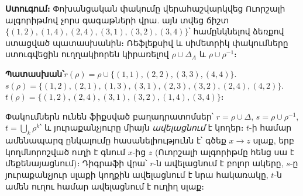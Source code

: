 \documentclass[11pt,a4paper]{article}
\newcommand{\answer}[1]{\begin{answerbox}\centering\textbf{Պատասխան՝}\quad #1\end{answerbox}}
\begin{document}
\begin{center}
\end{center}

\textbf{Ստուգում։} Փոխանցական փակումը վերահաշվարկվեց Ուորշալի ալգորիթմով չորս գագաթների վրա. այն
տվեց ճիշտ $\{(1,2),(1,4),(2,4),(3,1),(3,2),(3,4)\}$՝ համընկնելով ձեռքով ստացված պատասխանին։
Ռեֆլեքսիվ և սիմետրիկ փակումները ստուգվեցին ուղղակիորեն կիրառելով $\rho\cup\Delta_A$ և $\rho\cup\rho^{-1}$։
\checkmark

\answer{$r(\rho)=\rho\cup\{(1,1),(2,2),(3,3),(4,4)\}$.\quad
$s(\rho)=\{(1,2),(2,1),(1,3),(3,1),(2,3),(3,2),(2,4),(4,2)\}$.\quad
$t(\rho)=\{(1,2),(2,4),(3,1),(3,2),(1,4),(3,4)\}$։}

\begin{methodbox}
Փակումներն ունեն ֆիքսված բաղադրատոմսեր՝ $r=\rho\cup\Delta$,
$s=\rho\cup\rho^{-1}$, $t=\bigcup_k\rho^k$՝ և յուրաքանչյուրը միայն \emph{ավելացնում} է կողեր։ $t$-ի
համար ամենապարզ ընկալումը հասանելիությունն է՝ գծեք $x\to z$ սլաք, երբ կողմնորոշված ուղի է գնում
$x$-ից $z$ (Ուորշալի ալգորիթմը հենց սա է մեքենայացնում)։ Դիգրաֆի վրա՝ $r$-ն ավելացնում է բոլոր
ակերը, $s$-ը յուրաքանչյուր սլաքի կողքին ավելացնում է նրա հակառակը, $t$-ն ամեն ուղու համար ավելացնում է ուղիղ սլաք։
\end{methodbox}
\end{document}
